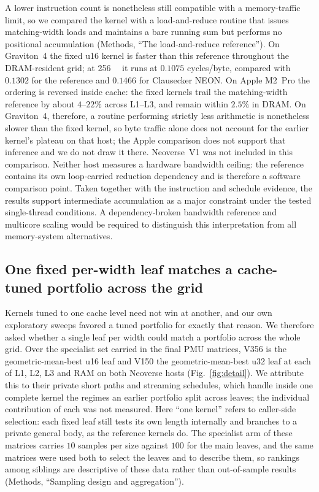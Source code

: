 \documentclass[fleqn,10pt]{wlscirep}
\begin{document}
A lower instruction count is nonetheless still compatible with a memory-traffic limit, so we compared the kernel with a load-and-reduce routine that issues matching-width loads and maintains a bare running sum but performs no positional accumulation (Methods, ``The load-and-reduce reference''). On Graviton~4 the fixed u16 kernel is faster than this reference throughout the DRAM-resident grid; at \SI{256}{\mebi\byte} it runs at $0.1075$ cycles/byte, compared with $0.1302$ for the reference and $0.1466$ for Clausecker NEON. On Apple M2~Pro the ordering is reversed inside cache: the fixed kernels trail the matching-width reference by about $4$--$22\%$ across L1--L3, and remain within $2.5\%$ in DRAM. On Graviton~4, therefore, a routine performing strictly less arithmetic is nonetheless slower than the fixed kernel, so byte traffic alone does not account for the earlier kernel's plateau on that host; the Apple comparison does not support that inference and we do not draw it there. Neoverse~V1 was not included in this comparison. Neither host measures a hardware bandwidth ceiling: the reference contains its own loop-carried reduction dependency and is therefore a software comparison point. Taken together with the instruction and schedule evidence, the results support intermediate accumulation as a major constraint under the tested single-thread conditions. A dependency-broken bandwidth reference and multicore scaling would be required to distinguish this interpretation from all memory-system alternatives.

\subsection*{One fixed per-width leaf matches a cache-tuned portfolio across the grid}

Kernels tuned to one cache level need not win at another, and our own exploratory sweeps favored a tuned portfolio for exactly that reason. We therefore asked whether a single leaf per width could match a portfolio across the whole grid. Over the specialist set carried in the final PMU matrices, V356 is the geometric-mean-best u16 leaf and V150 the geometric-mean-best u32 leaf at each of L1, L2, L3 and RAM on both Neoverse hosts (Fig.~\ref{fig:detail}). We attribute this to their private short paths and streaming schedules, which handle inside one complete kernel the regimes an earlier portfolio split across leaves; the individual contribution of each was not measured. Here ``one kernel'' refers to caller-side selection: each fixed leaf still tests its own length internally and branches to a private general body, as the reference kernels do. The specialist arm of these matrices carries $10$ samples per size against $100$ for the main leaves, and the same matrices were used both to select the leaves and to describe them, so rankings among siblings are descriptive of these data rather than out-of-sample results (Methods, ``Sampling design and aggregation'').
\end{document}
